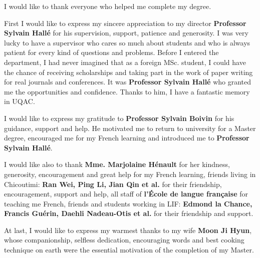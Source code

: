 
\begin{acknowledgements}

I would like to thank everyone who helped me complete my degree.

First I would like to express my sincere appreciation to my director \textbf{Professor Sylvain Hallé} for his supervision, support, patience and generosity. I was very lucky to have a supervisor who cares so much about students and who is always patient for every kind of questions and problems. Before I entered the department, I had never imagined that as a foreign MSc. student, I could have the chance of receiving scholarships and taking part in the work of paper writing for real journals and conferences. It was \textbf{Professor Sylvain Hallé} who granted me the opportunities and confidence. Thanks to him, I have a fantastic memory in UQAC.

I would like to express my gratitude to \textbf{Professor Sylvain Boivin} for his guidance, support and help. He motivated me to return to university for a Master degree, encouraged me for my French learning and introduced me to \textbf{Professor Sylvain Hallé}.

I would like also to thank \textbf{Mme. Marjolaine Hénault} for her kindness, generosity, encouragement and great help for my French learning, friends living in Chicoutimi: \textbf{Ran Wei, Ping Li, Jian Qin et al.} for their friendship, encouragement, support and help, all staff of \textbf{l'École de langue française} for teaching me French, friends and students working in LIF: \textbf{Edmond la Chance, Francis Guérin, Daehli Nadeau-Otis et al.} for their friendship and support.

At last, I would like to express my warmest thanks to my wife \textbf{Moon Ji Hyun}, whose companionship, selfless dedication, encouraging words and best cooking technique on earth were the essential motivation of the completion of my Master.

\end{acknowledgements}